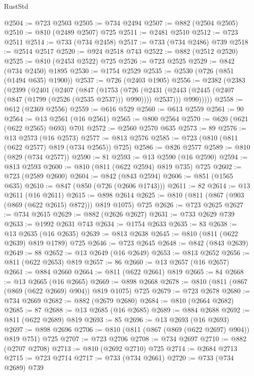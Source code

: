 \begin{lexlean}{RustStd}
\begin{coremodule}
@2504 := @723 @2503
@2505 := @734 @2494
@2507 := @882 (@2504 @2505)
@2510 := @810 (@2489 @2507) @725
@2511 := @2481 @2510
@2512 := @723 @2511
@2514 := @733 (@734 @2458)
@2517 := @733 (@734 @2486) @739
@2518 := @2514 @2517
@2520 := @924 @2518 @743
@2522 := @882 (@2512 @2520)
@2525 := @810 (@2453 @2522) @725
@2526 := @723 @2525
@2529 := @842 (@734 @2450) @1895
@2530 := @1754 @2529
@2535 := @2530 (@726 (@851 (@1494 @635) @1900))
@2537 := @726 (@2403 @1905)
@2556 := @2382
    (@2383
      (@2399
        (@2401
          (@2407
            (@847
              (@1753
                (@726
                  (@2431 (@2443 (@2445 (@2407 (@847 (@1799 (@2526 (@2535 @2537))) @990)))) @2537)))
              @990)))))
@2558 := @612 (@2369 @2556)
@2559 := @616 @529
@2560 := @613 @2559
@2561 := 90
@2564 := @13 @2561 (@16 @2561)
@2565 := @800 @2564
@2570 := @620 (@621 (@622 @2565) @693) @701
@2572 := @2560 @2570 @635
@2573 := 89
@2576 := @13 @2573 (@16 @2573)
@2577 := @813 @2576
@2585 := @723 (@810 (@811 (@622 @2577) @819 (@734 @2565)) @725)
@2586 := @826 @2577
@2589 := @810 (@829 (@734 @2577))
@2590 := 81
@2593 := @13 @2590 (@16 @2590)
@2594 := @813 @2593
@2600 := @810 (@811 (@622 @2594) @819 @735) @725
@2602 := @723 (@2589 @2600)
@2604 := @842 (@843 @2594)
@2606 := @851 (@1565 @635)
@2610 := @847 (@850 (@726 (@2606 @1743)))
@2611 := 82
@2614 := @13 @2611 (@16 @2611)
@2615 := @898 @2614
@2625 := @810 (@811 (@867 (@903 (@869 (@622 @2615) @872))) @819 @1075) @725
@2626 := @723 @2625
@2627 := @734 @2615
@2629 := @882 (@2626 @2627)
@2631 := @733 @2629 @739
@2633 := @1992 @2631 @743
@2634 := @1754 @2633
@2635 := 83
@2638 := @13 @2635 (@16 @2635)
@2639 := @813 @2638
@2645 := @810 (@811 (@622 @2639) @819 @1789) @725
@2646 := @723 @2645
@2648 := @842 (@843 @2639)
@2649 := 88
@2652 := @13 @2649 (@16 @2649)
@2653 := @813 @2652
@2656 := @811 (@622 @2653) @819
@2657 := 86
@2660 := @13 @2657 (@16 @2657)
@2661 := @884 @2660
@2664 := @811 (@622 @2661) @819
@2665 := 84
@2668 := @13 @2665 (@16 @2665)
@2669 := @898 @2668
@2678 := @810 (@811 (@867 (@869 (@622 @2669) @904)) @819 @1075) @725
@2679 := @723 @2678
@2680 := @734 @2669
@2682 := @882 (@2679 @2680)
@2684 := @810 (@2664 @2682)
@2685 := 87
@2688 := @13 @2685 (@16 @2685)
@2689 := @884 @2688
@2692 := @811 (@622 @2689) @819
@2693 := 85
@2696 := @13 @2693 (@16 @2693)
@2697 := @898 @2696
@2706 := @810 (@811 (@867 (@869 (@622 @2697) @904)) @819 @751) @725
@2707 := @723 @2706
@2708 := @734 @2697
@2710 := @882 (@2707 @2708)
@2713 := @810 (@2692 @2710) @725
@2714 := @2684 @2713
@2715 := @723 @2714
@2717 := @733 (@734 @2661)
@2720 := @733 (@734 @2689) @739

\end{coremodule}
\end{lexlean}
